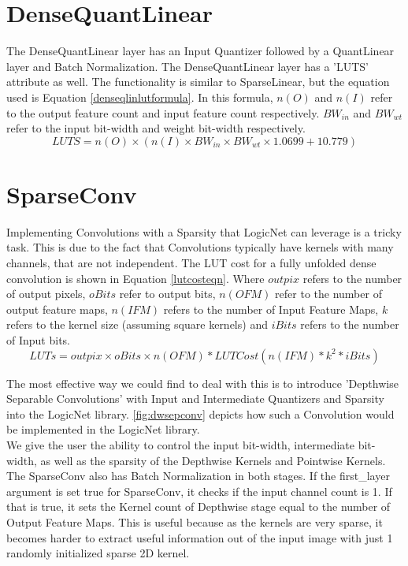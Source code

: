 \section{DenseQuantLinear}
The DenseQuantLinear layer has an Input Quantizer followed by a QuantLinear layer and Batch Normalization. 
The DenseQuantLinear layer has a 'LUTS' attribute as well. The functionality is similar to SparseLinear, but the equation used is Equation \eqref{denseqlinlutformula}. In this formula, $n(O)$ and $n(I)$ refer to the output feature count and input feature count respectively. $BW_{in}$ and $BW_{wt}$ refer to the input bit-width and weight bit-width respectively. 
\begin{equation}
    LUTS = n(O)\times(n(I)\times BW_{in}\times BW_{wt}\times 1.0699 + 10.779)
    \label{denseqlinlutformula}
\end{equation}


\section{SparseConv}
Implementing Convolutions with a Sparsity that LogicNet can leverage is a tricky task. This is due to the fact that Convolutions typically have kernels with many channels, that are not independent. The LUT cost for a fully unfolded dense convolution is shown in Equation \eqref{lutcosteqn}. Where $outpix$ refers to the number of output pixels, $oBits$ refer to output bits, $n(OFM)$ refer to the number of output feature maps, $n(IFM)$ refers to the number of Input Feature Maps, $k$ refers to the kernel size (assuming square kernels) and $iBits$ refers to the number of Input bits.
\begin{equation}
    LUTs = outpix\times oBits \times n(OFM) * LUTCost(n(IFM)*k^{2}*iBits)
    \label{lutcosteqn}
\end{equation}

The most effective way we could find to deal with this is to introduce 'Depthwise Separable Convolutions' with Input and Intermediate Quantizers and Sparsity into the LogicNet library. \cref{fig:dwsepconv} depicts how such a Convolution would be implemented in the LogicNet library.\\

We give the user the ability to control the input bit-width, intermediate bit-width, as well as the sparsity of the Depthwise Kernels and Pointwise Kernels. The SparseConv also has Batch Normalization in both stages.
If the first\_layer argument is set true for SparseConv, it checks if the input channel count is 1. If that is true, it sets the Kernel count of Depthwise stage equal to the number of Output Feature Maps. This is useful because as the kernels are very sparse, it becomes harder to extract useful information out of the input image with just 1 randomly initialized sparse 2D kernel.


